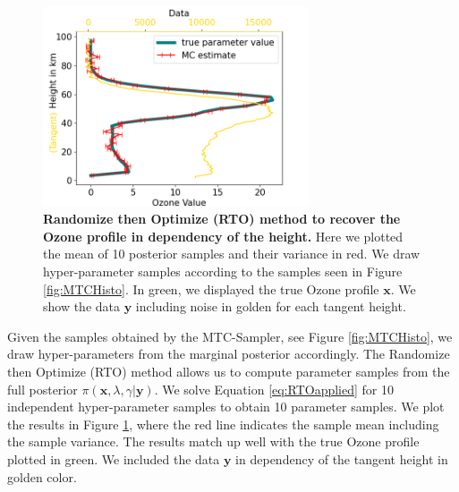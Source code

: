 \begin{figure}[htb]
\centering\includegraphics[width=0.7\textwidth]{FirstRecRes.png} 
\caption[Randomize then Optimize (RTO) method to recover the Ozone profile in dependency of the height.]{\textbf{Randomize then Optimize (RTO) method to recover the Ozone profile in dependency of the height.} Here we plotted the mean of 10 posterior samples and their variance in red. We draw hyper-parameter samples according to the samples seen in Figure \ref{fig:MTCHisto}. In green, we displayed the true Ozone profile $\bm{x}$.
We show the data $\bm{y}$ including noise in golden for each tangent height.}
\label{fig:RecRes}
\end{figure}
Given the samples obtained by the MTC-Sampler, see Figure \ref{fig:MTCHisto}, we draw hyper-parameters from the marginal posterior accordingly.
The Randomize then Optimize (RTO) method allows us to compute parameter samples from the full posterior $\pi(\bm{x},\lambda, \gamma|\bm{y})$.
We solve Equation \ref{eq:RTOapplied} for 10 independent hyper-parameter samples to obtain 10 parameter samples.
We plot the results in Figure \ref{fig:RecRes}, where the red line indicates the sample mean including the sample variance.
The results match up well with the true Ozone profile plotted in green.
We included the data $\bm{y}$ in dependency of the tangent height in golden color.









